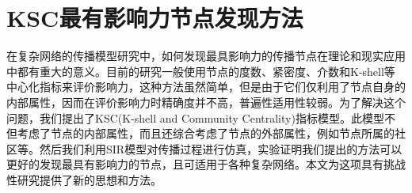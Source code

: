 

\chapter{KSC最有影响力节点发现方法}
\label{cha:3thChap03}

在复杂网络的传播模型研究中，如何发现最具影响力的传播节点在理论和现实应用中都有重大的意义。目前的研究一般使用节点的度数、紧密度、介数和K-shell等中心化指标来评价影响力，这种方法虽然简单，但是由于它们仅利用了节点自身的内部属性，因而在评价影响力时精确度并不高，普遍性适用性较弱。为了解决这个问题，我们提出了KSC(K-shell and Community Centrality)指标模型。此模型不但考虑了节点的内部属性，而且还综合考虑了节点的外部属性，例如节点所属的社区等。然后我们利用SIR模型对传播过程进行仿真，实验证明我们提出的方法可以更好的发现最具有影响力的节点，且可适用于各种复杂网络。本文为这项具有挑战性研究提供了新的思想和方法。


